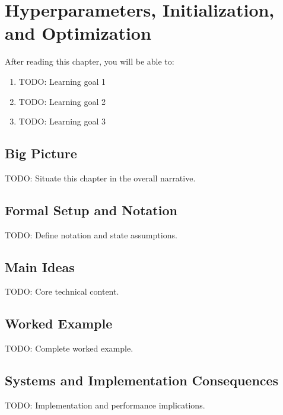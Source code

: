 \chapter{Hyperparameters, Initialization, and Optimization}
\label{ch:12}

\begin{keyinsight}
After reading this chapter, you will be able to:
\begin{enumerate}
  \item TODO: Learning goal 1
  \item TODO: Learning goal 2
  \item TODO: Learning goal 3
\end{enumerate}
\end{keyinsight}

\section{Big Picture}
\label{ch:12:sec:big_picture}

TODO: Situate this chapter in the overall narrative.

\section{Formal Setup and Notation}
\label{ch:12:sec:setup}

TODO: Define notation and state assumptions.

\section{Main Ideas}
\label{ch:12:sec:main}

TODO: Core technical content.

\section{Worked Example}
\label{ch:12:sec:example}

TODO: Complete worked example.

\section{Systems and Implementation Consequences}
\label{ch:12:sec:systems}

TODO: Implementation and performance implications.

